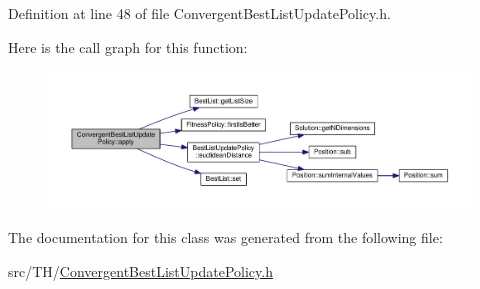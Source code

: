 Definition at line 48 of file Convergent\+Best\+List\+Update\+Policy.\+h.



Here is the call graph for this function\+:
\nopagebreak
\begin{figure}[H]
\begin{center}
\leavevmode
\includegraphics[width=350pt]{classConvergentBestListUpdatePolicy_a6382937d32ac8bab7169f216fcd3048f_cgraph}
\end{center}
\end{figure}




The documentation for this class was generated from the following file\+:\begin{DoxyCompactItemize}
\item 
src/\+T\+H/\hyperlink{ConvergentBestListUpdatePolicy_8h}{Convergent\+Best\+List\+Update\+Policy.\+h}\end{DoxyCompactItemize}
